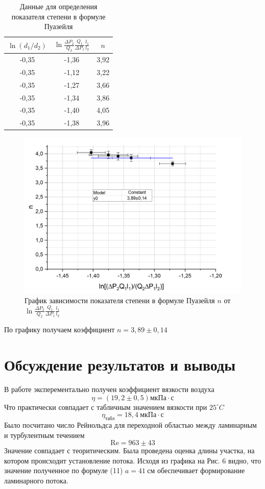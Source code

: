 \documentclass[a4paper,12pt]{article}
\theoremstyle{plain} %
\theoremstyle{definition} %
\theoremstyle{remark} %
\begin{document}
\renewcommand\arraystretch{1.5}
\begin{table}[h]
	\begin{center}
	\begin{tabular}{|c|c|c|}
		\hline
		$\ln(d_1/d_2)$   &$\ln \frac{\Delta P_2}{Q_2}\frac{Q_1 }{\Delta P_1} \frac{l_1}{l_2}$  & $n$ \\ \hline
		-0,35 & -1,36 & 3,92  \\ \hline
		-0,35 & -1,12 & 3,22  \\ \hline
		-0,35 & -1,27 & 3,66  \\ \hline
		-0,35 & -1,34 & 3,86  \\ \hline
		-0,35 & -1,40 & 4,05  \\ \hline
		-0,35 & -1,38 & 3,96  \\ \hline
	\end{tabular}
\end{center}
\caption{Данные для определения показателя степени в формуле Пуазейля}
\end{table}
\newpage
\begin{figure}[h]
	\begin{center}
		\includegraphics[width=0.7\linewidth]{6}
	\end{center}
	\caption{График зависимости показателя степени в формуле Пуазейля $n$ от $\ln \frac{\Delta P_2}{Q_2}\frac{Q_1 }{\Delta P_1} \frac{l_1}{l_2}$ }
\end{figure}
По графику получаем коэффициент $n = 3,89\pm0,14$
\section{Обсуждение результатов и выводы}
\noindent В работе эксперементально получен коэффициент вязкости воздуха
\[\eta = (19,2\pm0,5) \text{мкПа} \cdot \text{с}\]
Что практически совпадает с табличным значением вязкости при $25^\circ C$
\[\eta_{\text{табл}} = 18,4\ \text{мкПа} \cdot \text{с}\]
Было посчитано число Рейнольдса для переходной областью между ламинарным и турбулентным течением
\[\text{Re} = 963\pm43\]
Значение совпадает с теоритическим.
Была проведена оценка длины участка, на котором происходит установление потока. Исходя из графика на Рис. 6 видно, что значение полученное по формуле (11) $a = 41\ \text{см}$ обеспечивает формирование ламинарного потока.
\end{document}
